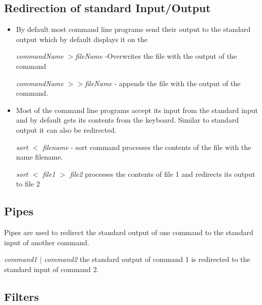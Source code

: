 \documentclass{article}
\begin{document}
\subsection{Redirection of standard Input/Output}
\begin{itemize}
\item By default most command line programs send their output to the standard output which by default displays it on the 

\hspace{10mm} \textit{commandName} $>$\textit{fileName} -Overwrites the file with the output of the command

\hspace{10mm} \textit{commandName} $>>$\textit{fileName} - appends the file with the output of the command.

\item Most of the command line programs accept its input from the standard input and by default gets its contents from the keyboard. Similar to standard output it can also be redirected.

\textit{sort $<$ filename} - sort command processes the contents of the file with the name filename.

\hspace{10mm} \textit{sort $<$ file1 $>$ file2} processes the contents of file 1 and redirects its output to file 2

\end{itemize}

\subsection{Pipes}
Pipes are used to redirect the standard output of one command to the standard input of another command.

\hspace{10mm} \textit{command1 $|$ command2} the standard output of command 1 is redirected to the standard input of command 2.

\subsection{Filters}
\end{document}
